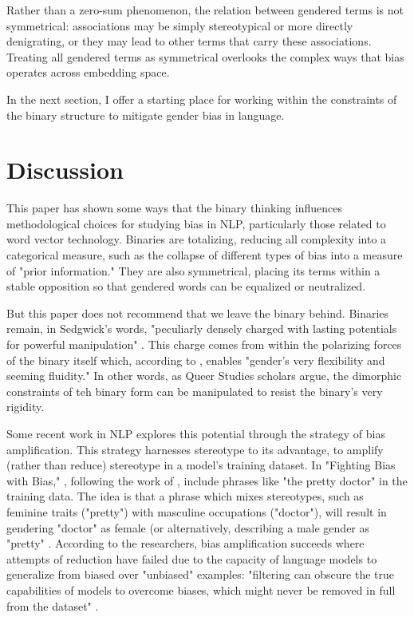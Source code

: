 \documentclass[11pt]{article}
\begin{document}
Rather than a zero-sum phenomenon, the relation between gendered terms
is not symmetrical: associations may be simply stereotypical or more
directly denigrating, or they may lead to other terms that carry these
associations. Treating all gendered terms as symmetrical overlooks the
complex ways that bias operates across embedding space.

In the next section, I offer a starting place for working within the constraints of the binary structure to mitigate gender bias in language. 

\section{Discussion}

This paper has shown some ways that the binary thinking influences
methodological choices for studying bias in NLP, particularly those related to word vector technology. Binaries are
totalizing, reducing all complexity into a categorical measure, such
as the collapse of different types of bias into a measure of "prior
information." They are also symmetrical, placing its terms within a
stable opposition so that gendered words can be equalized or
neutralized.

But this paper does not recommend that we leave the binary behind.
Binaries remain, in Sedgwick's words, "peculiarly densely charged with
lasting potentials for powerful manipulation" \citep{sedgwick:1990}.
This charge comes from within the polarizing forces of the binary
itself which, according to \citet{halberstam:1998}, enables "gender's very
flexibility and seeming fluidity." In other words, as Queer Studies scholars argue, the dimorphic constraints of teh binary form can be manipulated to resist the binary's very rigidity.

Some recent work in NLP explores this potential through the strategy
of bias amplification. This strategy harnesses stereotype to its
advantage, to amplify (rather than reduce) stereotype in a model's
training dataset. In "Fighting Bias with Bias," \citet{reif:2023},
following the work of \citet{stanovsky:2019}, include phrases like
"the pretty doctor" in the training data. The idea is that a phrase
which mixes stereotypes, such as feminine traits ("pretty") with
masculine occupations ("doctor"), will result in gendering "doctor"
as female (or alternatively, describing a male gender as "pretty" \citep{stanovsky:2019}. According to
the researchers, bias amplification succeeds where attempts of
reduction have failed due to the capacity of language models to
generalize from biased over "unbiased" examples: "filtering can
obscure the true capabilities of models to overcome biases, which
might never be removed in full from the dataset" \citep{reif:2023}.
\end{document}
